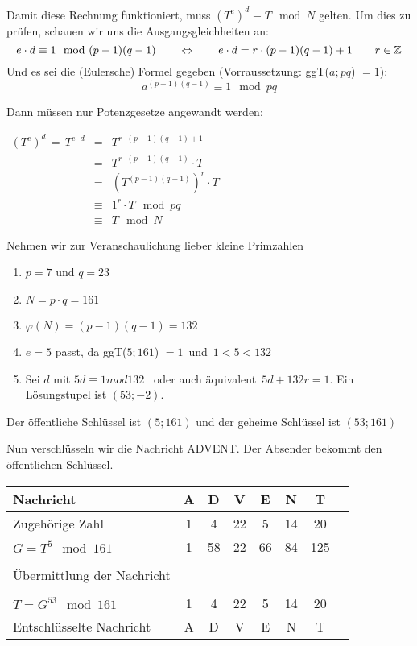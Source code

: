 \documentclass[main.tex]{subfiles}
\begin{document}
Damit diese Rechnung funktioniert, muss $(T^{e})^{d} \equiv T \mod N$ gelten. Um dies zu prüfen, schauen wir uns die Ausgangsgleichheiten an:
$$e \cdot d \equiv 1 \mod (p-1)(q-1) \qquad \Leftrightarrow \qquad e \cdot d = r \cdot (p-1)(q-1) +1 \qquad r \in \mathbb{Z}$$
Und es sei die (Eulersche) Formel gegeben (Vorraussetzung: ggT($a;pq$) $= 1$):
$$a^{(p-1)(q-1)} \equiv 1 \mod pq$$

Dann müssen nur Potenzgesetze angewandt werden:

$\begin{array}{rcl}
	\left(T^{e}\right)^d \, = \, T^{e \cdot d} & = &  T^{r \cdot (p-1)(q-1) +1}\\
	& = & T^{r \cdot (p-1)(q-1)} \cdot T \\
	& = & \left(T^{(p-1)(q-1)}\right)^r \cdot T \quad \\
	& \equiv & 1^r \cdot T \mod pq \quad \\
	& \equiv & T \mod N
\end{array}$


\begin{Beispiel}
	Nehmen wir zur Veranschaulichung lieber kleine Primzahlen
	\begin{enumerate}
		\item $p = 7$ und $q = 23$
		\item $N = p \cdot q = 161$
		\item $\varphi(N) = (p-1)(q-1) = 132$
		\item $e = 5$ passt, da ggT($5; 161$) $ = 1$ \,und\, $1<5<132$
		\item Sei $d$ mit $5d \equiv 1 mod 132$ \, oder auch äquivalent \,$5d + 132r = 1$. Ein Lösungstupel ist $(53;-2)$.
	\end{enumerate}
	Der öffentliche Schlüssel ist $(5;161)$ und der geheime Schlüssel ist $(53;161)$

	Nun verschlüsseln wir die Nachricht \glqq ADVENT\grqq. Der Absender bekommt den öffentlichen Schlüssel.

	\begin{tabular}{l*{6}{c}r}
		Nachricht              & A & D & V & E & N  & T  \\
		\hline
		Zugehörige Zahl & 1 & 4 & 22 & 5 & 14 & 20  \\
		$G = T^5 \mod 161$            & 1 & 58 & 22 & 66 &  84 & 125  \\\\
		Übermittlung der Nachricht &&&&&& \\\\
		$T = G^{53} \mod 161$         &  1 & 4 & 22 & 5 & 14 & 20  \\
		Entschlüsselte Nachricht              & A & D & V & E & N  & T  \\
	\end{tabular}
\end{Beispiel}
\end{document}
